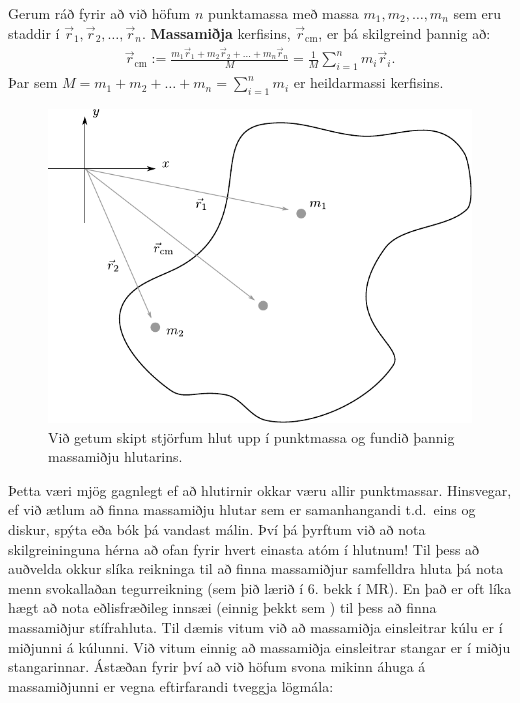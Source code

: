 \begin{tcolorbox}
\begin{definition}
Gerum ráð fyrir að við höfum $n$ punktamassa með massa $m_1, m_2, \ldots, m_n$ sem eru staddir í $\Vec{r}_1, \Vec{r}_2, \ldots, \Vec{r}_n$. \textbf{Massamiðja} kerfisins, $\Vec{r}_{\text{cm}}$, er þá skilgreind þannig að:
\begin{align*}
    \Vec{r}_{\text{cm}} := \frac{m_1 \Vec{r}_1 + m_2 \Vec{r}_2 + \ldots + m_n \Vec{r}_n}{M} = \frac{1}{M}\sum_{i=1}^{n} m_i \Vec{r}_i.
\end{align*}
Þar sem $M = m_1 + m_2 + \ldots + m_n = \sum\limits_{i=1}^{n}m_i$ er heildarmassi kerfisins.
\end{definition}
\end{tcolorbox}

\begin{figure}[H]
    \centering
    \includegraphics[scale = 1]{figures/cm1.pdf}
    \caption{Við getum skipt stjörfum hlut upp í punktmassa og fundið þannig massamiðju hlutarins.}
    \label{fig:cm1}
\end{figure}

Þetta væri mjög gagnlegt ef að hlutirnir okkar væru allir punktmassar. Hinsvegar, ef við ætlum að finna massamiðju hlutar sem er samanhangandi t.d.~eins og diskur, spýta eða bók þá vandast málin. Því þá þyrftum við að nota skilgreininguna hérna að ofan fyrir hvert einasta atóm í hlutnum! Til þess að auðvelda okkur slíka reikninga til að finna massamiðjur samfelldra hluta þá nota menn svokallaðan tegurreikning (sem þið lærið í 6. bekk í MR). En það er oft líka hægt að nota eðlisfræðileg innsæi (einnig þekkt sem ) til þess að finna massamiðjur stífrahluta. Til dæmis vitum við að massamiðja einsleitrar kúlu er í miðjunni á kúlunni. Við vitum einnig að massamiðja einsleitrar stangar er í miðju stangarinnar. Ástæðan fyrir því að við höfum svona mikinn áhuga á massamiðjunni er vegna eftirfarandi tveggja lögmála:

